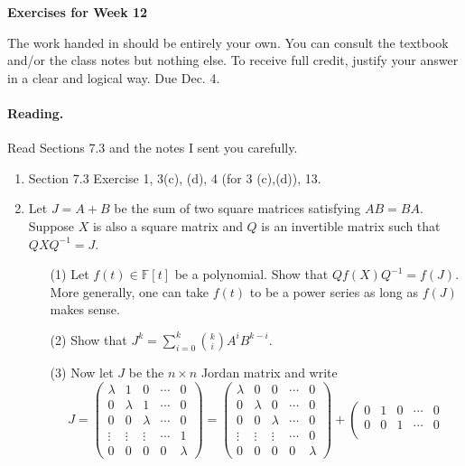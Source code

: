 \documentclass[11pt]{article}
\theoremstyle{plain}
\theoremstyle{definition}
\def\F{\mathbb F}
\begin{document}
\begin{center}
{\Large \bf Exercises for Week 12}
\end{center}
The work handed in should be entirely your own. You can consult the textbook and/or the class notes but nothing else. To receive full credit, justify your answer in a clear and logical way. Due Dec. 4.

\paragraph{Reading.} Read Sections 7.3 and the notes I sent you carefully.

\begin{enumerate}
\item Section 7.3 Exercise 1, 3(c), (d), 4 (for 3 (c),(d)), 13.
\item Let $J=A+B$ be the sum of two square matrices satisfying $AB=BA$. Suppose $X$ is also a square matrix and $Q$ is an invertible matrix such that $QXQ^{-1}=J$.
\begin{enumerate}
\item[(1)] Let $f(t)\in \F[t]$ be a polynomial. Show that $Qf(X)Q^{-1}=f(J)$. More generally, one can take $f(t)$ to be a power series as long as $f(J)$ makes sense.
\item[(2)] Show that $J^k= \sum_{i=0}^k {k \choose i} A^iB^{k-i}$.
\item[(3)] Now let $J$ be the $n\times n$ Jordan matrix and write
\[
J=
\left(
\begin{matrix}
\lambda & 1 & 0 &\cdots & 0 \\
 0  & \lambda & 1 & \cdots & 0\\
 0  &  0  &  \lambda & \cdots & 0\\
 \vdots & \vdots & \vdots & \cdots & 1\\
 0 & 0 & 0 &  0 &\lambda
\end{matrix}
\right)=
\left(
\begin{matrix}
\lambda & 0 & 0 &\cdots & 0 \\
 0  & \lambda & 0 & \cdots & 0\\
 0  &  0  &  \lambda & \cdots & 0\\
 \vdots & \vdots & \vdots & \cdots & 0\\
 0 & 0 & 0 &  0 &\lambda
\end{matrix}
\right)+
\left(
\begin{matrix}
0 & 1 & 0 &\cdots & 0 \\
 0  & 0 & 1 & \cdots & 0\\

\end{matrix}\]
\end{enumerate}
\end{enumerate}
\end{document}
